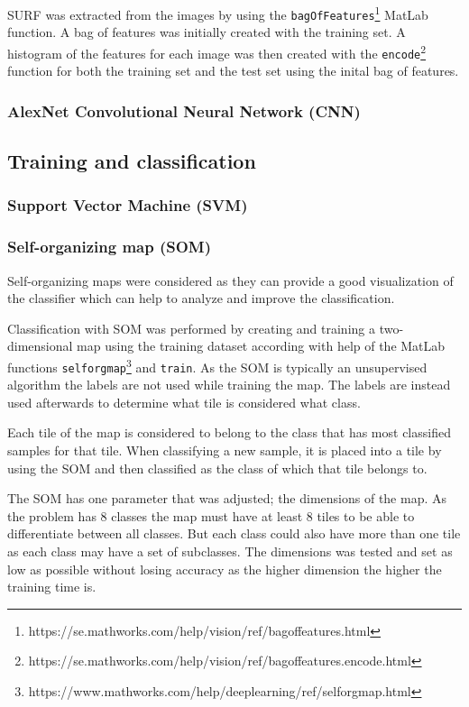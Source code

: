 \documentclass[doc/report.tex]{subfiles}
\begin{document}
SURF was extracted from the images by using the
\texttt{bagOfFeatures}\footnote{https://se.mathworks.com/help/vision/ref/bagoffeatures.html}
MatLab function. A bag of features was initially created with the training set.
A histogram of the features for each image was then created with the
\texttt{encode}\footnote{https://se.mathworks.com/help/vision/ref/bagoffeatures.encode.html}
function for both the training set and the test set using the inital bag of
features. 

\subsubsection{AlexNet Convolutional Neural Network (CNN)}


\subsection{Training and classification}

\subsubsection{Support Vector Machine (SVM)}

\subsubsection{Self-organizing map (SOM)}
Self-organizing maps were considered as they can provide a good visualization
of the classifier which can help to analyze and improve the classification.

Classification with SOM was performed by creating and training a
two-dimensional map using the training dataset according with help of the
MatLab functions
\texttt{selforgmap}\footnote{https://www.mathworks.com/help/deeplearning/ref/selforgmap.html}
and \texttt{train}. As the SOM is typically an unsupervised algorithm the
labels are not used while training the map. The labels are instead used
afterwards to determine what tile is considered what class.

Each tile of the map is considered to belong to the class that has most
classified samples for that tile. When classifying a new sample, it is placed
into a tile by using the SOM and then classified as the class of which that
tile belongs to.

The SOM has one parameter that was adjusted; the dimensions of the map. As the
problem has 8 classes the map must have at least 8 tiles to be able to
differentiate between all classes. But each class could also have more than one
tile as each class may have a set of subclasses. The dimensions was tested and
set as low as possible without losing accuracy as the higher dimension the
higher the training time is.
    
\end{document}
